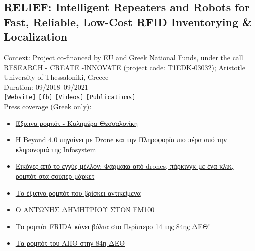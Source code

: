 \subsection{RELIEF: Intelligent Repeaters and Robots for Fast, Reliable, Low-Cost RFID Inventorying \& Localization}

Context: Project co-financed by EU and Greek National Funds, under the call RESEARCH - CREATE -INNOVATE (project code: T1EDK-03032); Aristotle University of Thessaloniki, Greece\\

\noindent Duration: 09/2018--09/2021\\

\noindent \href{http://relief.web.auth.gr/language/en/home/}{\texttt{[Website]}} \href{https://www.facebook.com/ReliefAuth}{\texttt{[fb]}} \href{https://www.youtube.com/@antonidimi/search?query=relief}{\texttt{[Videos]}} \href{https://relief.web.auth.gr/language/en/publications/}{\texttt{[Publications]}} \\

\noindent Press coverage (Greek only):

\begin{itemize}
  \singlespacing
  \item \href{https://www.facebook.com/watch/?v=525073015980746}{Έξυπνα ρομπότ - Καλημέρα Θεσσαλονίκη}
  \item \href{https://www.amna.gr/macedonia/article/593568/I-Beyond-40-pigainei-me-Drone-kai-tin-Pliroforia-pio-pera-apo-tin-klironomia-tis-Infosystem}{Η Beyond 4.0 πηγαίνει με Drone και την Πληροφορία πιο πέρα από την κληρονομιά της Infosystem}
  \item \href{https://www.kathimerini.gr/society/561544489/vinteo-k-eikones-apo-to-eggys-mellon-farmaka-apo-drones-parkingk-me-ena-klik-rompot-sta-soyper-market/}{Εικόνες από το εγγύς μέλλον: Φάρμακα από drones, πάρκινγκ με ένα κλικ, ρομπότ στα σούπερ μάρκετ}
  \item \href{https://www.thessnews.gr/reportaz/to-exypno-robot-pou-vriskei-antikeimena-foto-video/}{Το έξυπνο ρομπότ που βρίσκει αντικείμενα}
  \item \href{https://fm100.gr/media/single/o-antonis-dimitrioy-ston-fm100-o-fm100-stin-84i-deth}{Ο ΑΝΤΩΝΗΣ ΔΗΜΗΤΡΙΟΥ ΣΤΟΝ FM100}
  \item \href{https://www.typosthes.gr/thessaloniki/195192_rompot-frida-kanei-bolta-sto-periptero-14-tis-84is-deth-video}{Το ρομπότ FRIDA κάνει βόλτα στο Περίπτερο 14 της 84ης ΔΕΘ!}
  \item \href{https://www.amna.gr/home/videos/391130/Ta-rompot-tou-APTh-stin-84i-DETh}{Τα ρομπότ του ΑΠΘ στην 84η ΔΕΘ}
\end{itemize}



